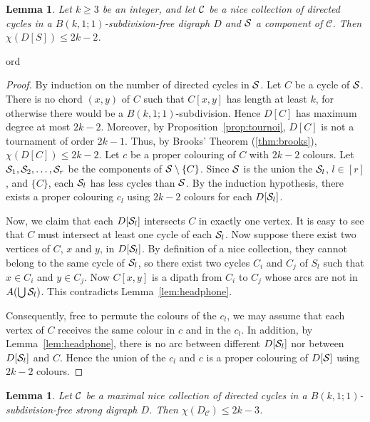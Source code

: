 \documentclass[utf8,10pt]{article}
\theoremstyle{plain}
\newtheorem{lemma}[theorem]{Lemma}
\theoremstyle{definition}
\theoremstyle{remark}
\begin{document}
\begin{lemma}\label{lem:compo1}
Let $k\geq 3$ be an integer, and let ${\cal C}$ be a nice collection of directed cycles in a $B(k,1;1)$-subdivision-free digraph $D$ and ${\cal S}$ a component of $\mathcal{C}$. Then $\chi(D[S]) \leq 2k-2$.	 
\end{lemma}
ord
\begin{proof}
By induction on the number of directed cycles in ${\cal S}$. Let $C$ be a cycle of ${\cal S}$. There is no chord $(x,y)$ of $C$
such that $C[x,y]$ has length at least $k$, for otherwise there would be a $B(k,1;1)$-subdivision. Hence $D[C]$ has maximum degree at most $2k-2$. Moreover, by Proposition~\ref{prop:tournoi}, $D[C]$ is not a tournament of order $2k-1$.
Thus, by Brooks' Theorem (\ref{thm:brooks}), $\chi(D[C])\leq 2k-2$.
 Let $c$ be a proper colouring of $C$ with $2k-2$ colours. Let ${\cal S}_1, {\cal S}_2, \dots, {\cal S}_r$ be the components of ${\cal S} \setminus \{C\}$. Since ${\cal S}$ is the union the ${\cal S}_l$, $l\in [r]$, and $\{C\}$,
each ${\cal S}_l$ has less cycles than ${\cal S}$. By the induction hypothesis, there exists a proper colouring $c_l$ using $2k-2$ colours for each $D[{\cal S}_l]$.
 
Now, we claim that each $D[{\cal S}_l]$ intersects $C$ in exactly one vertex. It is easy to see that $C$ must intersect at least one cycle of each ${\cal S}_l$.
Now suppose there exist two vertices of $C$, $x$ and $y$, in $D[{\cal S}_l]$. By definition of a nice collection, they cannot belong to the same cycle 
of ${\cal S}_l$, so there exist two cycles $C_i$ and $C_j$ of $S_l$ such that $x \in C_i$ and $y \in C_j$. Now $C[x,y]$ is a dipath from $C_i$ to $C_j$ whose arcs are not in $A(\bigcup {\cal S}_l)$. This contradicts Lemma~\ref{lem:headphone}. 

Consequently, free to permute the colours of the $c_l$,
we may assume that each vertex of $C$ receives the same colour in $c$ and in the $c_l$. 
In addition, by Lemma~\ref{lem:headphone}, there is no arc between different $D[{\cal S}_l]$ nor between $D[{\cal S}_l]$ and $C$. Hence the union of the 
$c_l$ and $c$ is a proper colouring of $D[{\cal S}]$ using $2k-2$ colours. 
\end{proof}


\begin{lemma}\label{lem:reduce}
Let ${\cal C}$ be a maximal nice collection of directed cycles in a $B(k,1;1)$-subdivision-free strong digraph $D$. Then $\chi(D_{\mathcal{C}}) \leq 2k-3$.
\end{lemma}
\end{document}
